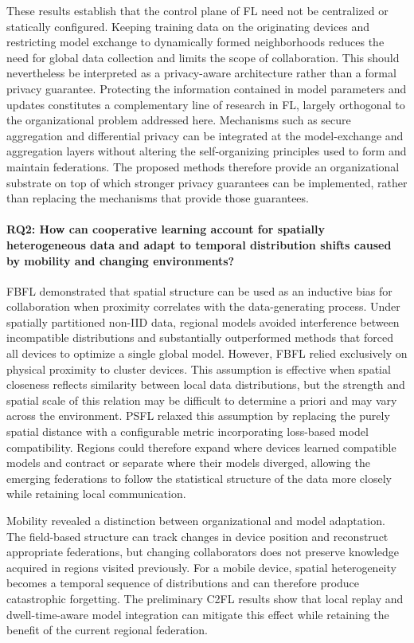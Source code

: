 These results establish that the control plane of \gls{FL} need not be centralized 
 or statically configured.
%
Keeping training data on the originating devices 
 and restricting model exchange to dynamically formed neighborhoods reduces the need 
 for global data collection and limits the scope of collaboration.
%
This should nevertheless be interpreted as a privacy-aware architecture 
 rather than a formal privacy guarantee. 
% 
Protecting the information contained in model parameters 
 and updates constitutes a complementary line of research in \gls{FL}, 
 largely orthogonal to the organizational problem addressed here. 
% 
Mechanisms such as secure aggregation 
 and differential privacy can be integrated at the model-exchange 
 and aggregation layers without altering the self-organizing principles 
 used to form and maintain federations. 
% 
The proposed methods therefore provide an organizational substrate 
 on top of which stronger privacy guarantees can be implemented, 
 rather than replacing the mechanisms that provide those guarantees.

\paragraph{RQ2: How can cooperative learning account for spatially heterogeneous
data and adapt to temporal distribution shifts caused by mobility and changing
environments?}
FBFL demonstrated that spatial structure can be used as an inductive bias for
collaboration when proximity correlates with the data-generating process. Under
spatially partitioned non-\gls{IID} data, regional models avoided interference
between incompatible distributions and substantially outperformed methods that
forced all devices to optimize a single global model.
%
However, 
 FBFL relied exclusively on physical proximity to cluster devices. 
% 
This assumption is effective when spatial closeness reflects similarity 
 between local data distributions, 
 but the strength and spatial scale of this relation may be difficult 
 to determine a priori and may vary across the environment. 
% 
PSFL relaxed this assumption by replacing the purely spatial distance 
 with a configurable metric incorporating loss-based model compatibility. 
% 
Regions could therefore expand where devices learned compatible models 
 and contract or separate where their models diverged, 
 allowing the emerging federations to follow the statistical structure of the data more closely 
 while retaining local communication.

Mobility revealed a distinction between organizational and model adaptation.
%
The field-based structure can track changes in device position 
 and reconstruct appropriate federations, 
 but changing collaborators does not preserve knowledge acquired in regions visited previously.
%
For a mobile device, 
 spatial heterogeneity becomes a temporal sequence of distributions 
 and can therefore produce catastrophic forgetting.
%
The preliminary C2FL results show that local replay and dwell-time-aware model integration 
 can mitigate this effect while retaining the benefit of the current regional federation.


